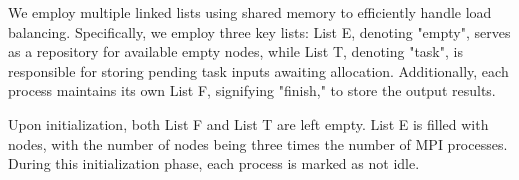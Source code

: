 

We employ multiple linked lists using shared memory to efficiently handle load balancing. Specifically, we employ three key lists: List E, denoting "empty", serves as a repository for available empty nodes, while List T, denoting "task", is responsible for storing pending task inputs awaiting allocation. Additionally, each process maintains its own List F, signifying "finish," to store the output results.

Upon initialization, both List F and List T are left empty. List E is filled with nodes, with the number of nodes being three times the number of MPI processes. During this initialization phase, each process is marked as not idle.


